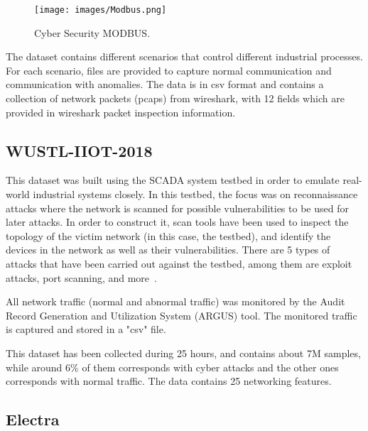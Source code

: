 \documentclass[english,12pt]{article}
\begin{document}
\begin{figure}[htb]
  \begin{centering}
      \texttt{[image: images/Modbus.png]}
  \par\end{centering}
  \caption{\label{fig:modbus}Cyber Security MODBUS.}
\end{figure}


The dataset contains different scenarios that control different industrial processes. For each scenario, files
are provided to capture normal communication and communication with anomalies. The data is in csv format and
contains a collection of network packets (pcaps) from wireshark, with 12 fields which are provided in wireshark
packet inspection information.


\subsection{WUSTL-IIOT-2018} \label{WUSTL-IIOT-2018}

This dataset was built using the SCADA system testbed in order to emulate real-world industrial systems closely.
In this testbed, the focus was on reconnaissance attacks where the network is scanned for possible vulnerabilities
to be used for later attacks. In order to construct it, scan tools have been used to inspect the topology of the victim
network (in this case, the testbed), and identify the devices in the network as well as their vulnerabilities.
There are 5 types of attacks that have been carried out against the testbed, among them are exploit attacks, port
scanning, and more~\cite{cse}.

All network traffic (normal and abnormal traffic) was monitored by the Audit Record Generation and Utilization System
(ARGUS) tool. The monitored traffic is captured and stored in a "csv" file.

This dataset has been collected during 25 hours, and contains about 7M samples, while around 6\% of them corresponds
with cyber attacks and the other ones corresponds with normal traffic. The data contains 25 networking features.


\subsection{Electra} \label{Electra}
\end{document}
